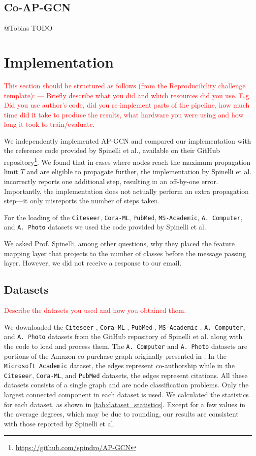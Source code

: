 \documentclass{gdl}
\begin{document}
\subsection{Co-AP-GCN}
@Tobias TODO

\section{Implementation}

\textcolor{red}{
This section should be structured as follows (from the Reproducibility challenge template):
---
Briefly describe what you did and which resources did you use. E.g. Did you use author's code, did you re-implement parts of the pipeline, how much time did it take to produce the results, what hardware you were using and how long it took to train/evaluate. }

We independently implemented AP-GCN and compared our implementation with the reference code provided by Spinelli et al., available on their GitHub repository\footnote{\url{https://github.com/spindro/AP-GCN}}. We found that in cases where nodes reach the maximum propagation limit $T$ and are eligible to propagate further, the implementation by Spinelli et al. incorrectly reports one additional step, resulting in an off-by-one error. Importantly, the implementation does not actually perform an extra propagation step—it only misreports the number of steps taken.

For the loading of the \texttt{Citeseer}, \texttt{Cora-ML}, \texttt{PubMed}, \texttt{MS-Academic}, \texttt{A. Computer}, and \texttt{A. Photo} datasets we used the code provided by Spinelli et al.

We asked Prof. Spinelli, among other questions, why they placed the feature mapping layer that projects to the number of classes before the message passing layer. However, we did not receive a response to our email.

\subsection{Datasets}
\textcolor{red}{Describe the datasets you used and how you obtained them. }

We downloaded the \texttt{Citeseer} \cite{sen2008}, \texttt{Cora-ML} \cite{mccallum2000}, \texttt{PubMed} \cite{namata2012}, \texttt{MS-Academic} \cite{shchur2018}, \texttt{A. Computer}, and \texttt{A. Photo} datasets from the GitHub repository of Spinelli et al. along with the code to load and process them. The \texttt{A. Computer} and \texttt{A. Photo} datasets are portions of the Amazon co-purchase graph originally presented in \cite{mcauley2015}. In the \texttt{Microsoft Academic} dataset, the edges represent co-authorship while in the \texttt{Citeseer}, \texttt{Cora-ML}, and \texttt{PubMed} datasets, the edges represent citations. All these datasets consists of a single graph and are node classification problems. Only the largest connected component in each dataset is used. We calculated the statistics for each dataset, as shown in \autoref{tab:dataset_statistics}. Except for a few values in the average degrees, which may be due to rounding, our results are consistent with those reported by Spinelli et al.
\end{document}
